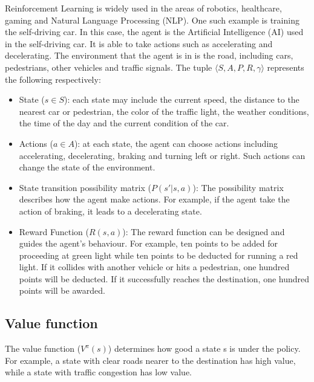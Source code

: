 \documentclass{article} %
\begin{document}
Reinforcement Learning is widely used in the areas of robotics, healthcare, gaming and Natural Language Processing (NLP)\cite{scribbr_rl_applications}. One such example is training the self-driving car. In this case, the agent is the Artificial Intelligence (AI) used in the self-driving car. It is able to take actions such as accelerating and decelerating. The environment that the agent is in is the road, including cars, pedestrians, other vehicles and traffic signals. The tuple \(\langle S, A, P, R, \gamma \rangle\) represents the following respectively:
\begin{itemize}
    \item State (\(s \in S\)): 
each state may include the current speed, the distance to the nearest car or pedestrian, the color of the traffic light, the weather conditions, the time of the day and the current condition of the car.
\end{itemize}
\begin{itemize}
    \item Actions (\(a \in A\)): 
at each state, the agent can choose actions including accelerating, decelerating, braking and turning left or right. Such actions can change the state of the environment.
\end{itemize}
\begin{itemize}
    \item State transition possibility matrix (\( P(s' | s, a) \)): 
The possibility matrix describes how the agent make actions. For example, if the agent take the action of braking, it leads to a decelerating state.
\end{itemize}
\begin{itemize}
    \item Reward Function (\( R(s, a) \)): 
The reward function can be designed and guides the agent's behaviour. For example, ten points to be added for proceeding at green light while ten points to be deducted for running a red light. If it collides with another vehicle or hits a pedestrian, one hundred points will be deducted. If it successfully reaches the destination, one hundred points will be awarded. 
\end{itemize}


\subsection{Value function}
The value function (\(V^{\pi}(s)\)) determines how good a state s is under the policy. For example, a state with clear roads nearer to the destination has high value, while a state with traffic congestion has low value.
\end{document}
